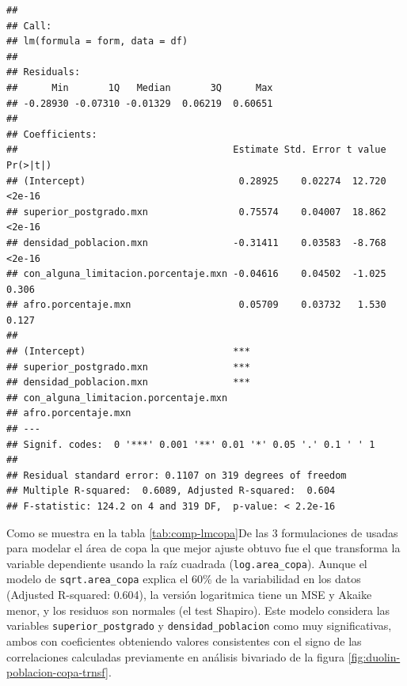 \documentclass[12pt,]{book}
\begin{document}
\begin{verbatim}
## 
## Call:
## lm(formula = form, data = df)
## 
## Residuals:
##      Min       1Q   Median       3Q      Max 
## -0.28930 -0.07310 -0.01329  0.06219  0.60651 
## 
## Coefficients:
##                                      Estimate Std. Error t value Pr(>|t|)
## (Intercept)                           0.28925    0.02274  12.720   <2e-16
## superior_postgrado.mxn                0.75574    0.04007  18.862   <2e-16
## densidad_poblacion.mxn               -0.31411    0.03583  -8.768   <2e-16
## con_alguna_limitacion.porcentaje.mxn -0.04616    0.04502  -1.025    0.306
## afro.porcentaje.mxn                   0.05709    0.03732   1.530    0.127
##                                         
## (Intercept)                          ***
## superior_postgrado.mxn               ***
## densidad_poblacion.mxn               ***
## con_alguna_limitacion.porcentaje.mxn    
## afro.porcentaje.mxn                     
## ---
## Signif. codes:  0 '***' 0.001 '**' 0.01 '*' 0.05 '.' 0.1 ' ' 1
## 
## Residual standard error: 0.1107 on 319 degrees of freedom
## Multiple R-squared:  0.6089, Adjusted R-squared:  0.604 
## F-statistic: 124.2 on 4 and 319 DF,  p-value: < 2.2e-16
\end{verbatim}

Como se muestra en la tabla \ref{tab:comp-lmcopa}De las 3 formulaciones
de usadas para modelar el área de copa la que mejor ajuste obtuvo fue el
que transforma la variable dependiente usando la raíz cuadrada
(\texttt{log.area\_copa}). Aunque el modelo de \texttt{sqrt.area\_copa}
explica el 60\% de la variabilidad en los datos (Adjusted R-squared:
0.604), la versión logaritmica tiene un MSE y Akaike menor, y los
residuos son normales (el test Shapiro). Este modelo considera las
variables \texttt{superior\_postgrado} y \texttt{densidad\_poblacion}
como muy significativas, ambos con coeficientes obteniendo valores
consistentes con el signo de las correlaciones calculadas previamente en
análisis bivariado de la figura \ref{fig:duolin-poblacion-copa-trnsf}.
\end{document}
